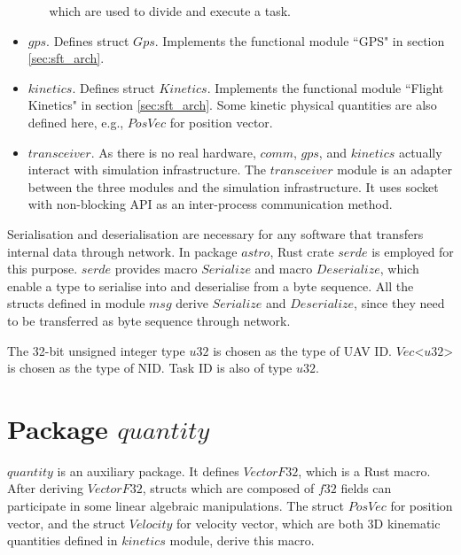 \begin{itemize}
\begin{itemize}
            which are used to divide and execute a task.
    \end{itemize}
  \item $gps$. Defines struct $Gps$.
        Implements the functional module ``GPS" in section \ref{sec:sft_arch}.
  \item $kinetics$. Defines struct $Kinetics$.
        Implements the functional module ``Flight Kinetics" in section \ref{sec:sft_arch}.
        Some kinetic physical quantities are also defined here,
        e.g., $PosVec$ for position vector.
  \item $transceiver$. As there is no real hardware,
        $comm$, $gps$, and $kinetics$ actually interact with simulation infrastructure.
        The $transceiver$ module is an adapter
        between the three modules and the simulation infrastructure.
        It uses socket with non-blocking API as an inter-process communication method.
\end{itemize}

Serialisation and deserialisation are necessary for any software that
transfers internal data through network.
In package $astro$, Rust crate $serde$ is employed for this purpose.
$serde$ provides macro $Serialize$ and macro $Deserialize$,
which enable a type to serialise into and deserialise from a byte sequence.
All the structs defined in module $msg$ derive $Serialize$ and $Deserialize$,
since they need to be transferred as byte sequence through network.

The 32-bit unsigned integer type $u32$ is chosen as the type of UAV ID.
$Vec$<$u32$> is chosen as the type of NID.
Task ID is also of type $u32$.

\section{Package \texorpdfstring{$quantity$}{quantity}}

$quantity$ is an auxiliary package.
It defines $VectorF32$, which is a Rust macro.
After deriving $VectorF32$,
structs which are composed of $f32$ fields
can participate in some linear algebraic manipulations.
The struct $PosVec$ for position vector, and the struct $Velocity$ for velocity vector,
which are both 3D kinematic quantities defined in $kinetics$ module,
derive this macro.